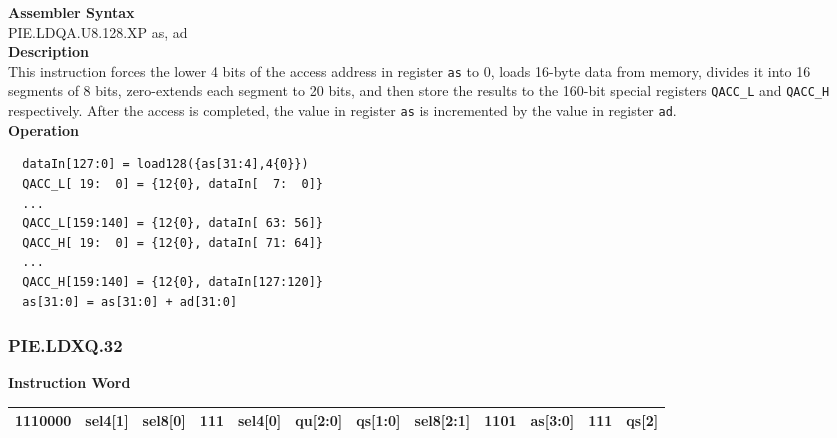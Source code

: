 \textbf{Assembler Syntax} \\
PIE.LDQA.U8.128.XP as, ad \\
\textbf{Description} \\
This instruction forces the lower 4 bits of the access address in register \lstinline{as} to 0, loads 16-byte data from memory, divides it into 16 segments of 8 bits, zero-extends each segment to 20 bits, and then store the results to the 160-bit special registers \lstinline{QACC_L} and \lstinline{QACC_H} respectively. After the access is completed, the value in register \lstinline{as} is incremented by the value in register \lstinline{ad}.\\
\textbf{Operation}
\begin{lstlisting}
  dataIn[127:0] = load128({as[31:4],4{0}})
  QACC_L[ 19:  0] = {12{0}, dataIn[  7:  0]}
  ...
  QACC_L[159:140] = {12{0}, dataIn[ 63: 56]}
  QACC_H[ 19:  0] = {12{0}, dataIn[ 71: 64]}
  ...
  QACC_H[159:140] = {12{0}, dataIn[127:120]}
  as[31:0] = as[31:0] + ad[31:0]
\end{lstlisting}

\newpage
\subsubsection{PIE.LDXQ.32}\label{instruction:PIELDXQ32}
\setlength\tabcolsep{6pt}
\textbf{Instruction Word} \\
\begin{tabular}{|c|c|c|c|c|c|c|c|c|c|c|c|}
	\hline
	1110000 & sel4[1] & sel8[0] & 111 & sel4[0] & qu[2:0] & qs[1:0] & sel8[2:1] & 1101 & as[3:0] & 111 & qs[2] \\
	\hline
\end{tabular}


